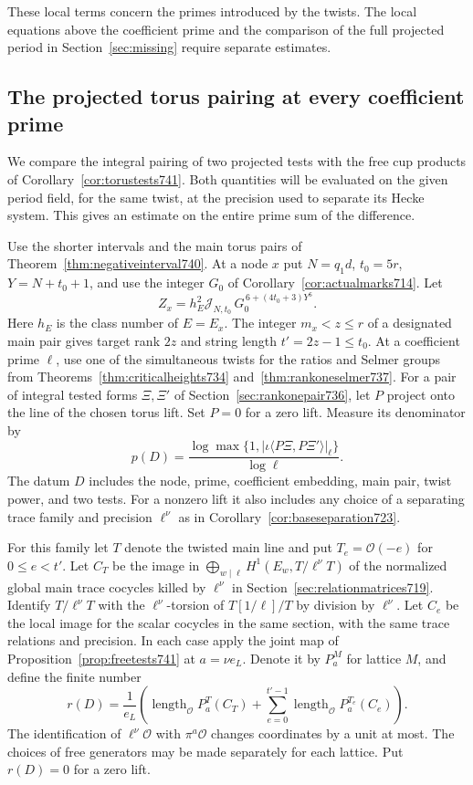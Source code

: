 \documentclass[a4paper,11pt]{article}
\theoremstyle{definition}
\theoremstyle{remark}
\numberwithin{equation}{section}
\begin{document}
These local terms concern the primes introduced by the twists.
The local equations above the coefficient prime and the
comparison of the full projected period in Section~\ref{sec:missing}
require separate estimates.
\clearpage

\subsection{The projected torus pairing at every coefficient prime}
\label{sec:projectedcups742}

We compare the integral pairing of two projected tests with the
free cup products of Corollary~\ref{cor:torustests741}. Both
quantities will be evaluated on the given period field, for the
same twist, at the precision used to separate its Hecke system.
This gives an estimate on the entire prime sum of the difference.

Use the shorter intervals and the main torus pairs of
Theorem~\ref{thm:negativeinterval740}. At a node \(x\) put
\(N=q_1d\), \(t_0=5r\), \(Y=N+t_0+1\), and use the integer
\(G_0\) of Corollary~\ref{cor:actualmarks714}. Let
\[
        Z_x=h_E^2\mathcal J_{N,t_0}\,
                       G_0^{\,6+(4t_0+3)Y^6}.
\]
Here \(h_E\) is the class number of \(E=E_x\). The integer
\(m_x<z\le r\) of a designated main pair gives target rank
\(2z\) and string length \(t'=2z-1\le t_0\).
At a coefficient prime \(\ell\), use one of the simultaneous
twists for the ratios and Selmer groups from
Theorems~\ref{thm:criticalheights734} and~\ref{thm:rankoneselmer737}.
For a pair of integral tested forms \(\Xi,\Xi'\) of
Section~\ref{sec:rankonepair736}, let \(P\) project onto the
line of the chosen torus lift. Set \(P=0\) for a zero lift.
Measure its denominator by
\[
 p(D)=\frac{\log\max\{1,|\iota\langle P\Xi,P\Xi'\rangle|_\ell\}}
                  {\log\ell}.
\]
The datum \(D\) includes the node, prime, coefficient embedding,
main pair, twist power, and two tests. For a nonzero lift it also
includes any choice of a separating trace family and precision
\(\ell^\nu\) as in Corollary~\ref{cor:baseseparation723}.

For this family let \(T\) denote the twisted main line and put
\(T_e=\mathcal O(-e)\) for \(0\le e<t'\). Let \(C_T\) be the
image in \(\bigoplus_{w\mid\ell}H^1(E_w,T/\ell^\nu T)\)
of the normalized global main trace cocycles killed by
\(\ell^\nu\) in Section~\ref{sec:relationmatrices719}. Identify
\(T/\ell^\nu T\) with the \(\ell^\nu\)-torsion of
\(T[1/\ell]/T\) by division by \(\ell^\nu\).
Let \(C_e\) be the local image for the scalar cocycles in the
same section, with the same trace relations and precision.
In each case apply the joint map of Proposition~\ref{prop:freetests741}
at \(a=\nu e_L\). Denote it by \(P_a^M\) for lattice \(M\), and
define the finite number
\[
 r(D)=\frac{1}{e_L}\left(
    \operatorname{length}_{\mathcal O}P_a^T(C_T)
       +\sum_{e=0}^{t'-1}
         \operatorname{length}_{\mathcal O}P_a^{T_e}(C_e)\right).
\]
The identification of \(\ell^\nu\mathcal O\) with
\(\pi^a\mathcal O\) changes coordinates by a unit at most. The
choices of free generators may be made separately for each
lattice. Put \(r(D)=0\) for a zero lift.
\end{document}
